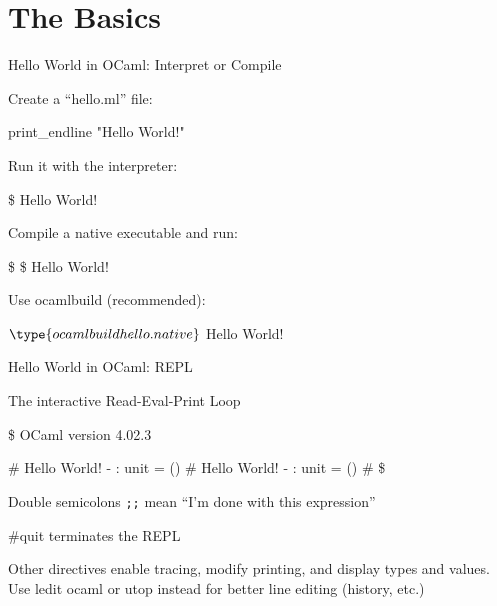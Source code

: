 \documentclass{plt}
\begin{document}
\part{The Basics}

\begin{frame}[fragile]{Hello World in OCaml: Interpret or Compile}

Create a ``hello.ml'' file:

\begin{ocaml}
print_endline "Hello World!"
\end{ocaml}

Run it with the interpreter:

\begin{interactive}
\$ 
Hello World!
\end{interactive}
%
Compile a native executable and run:

\begin{interactive}
\$ 
\$ 
Hello World!
\end{interactive}
%
Use ocamlbuild (recommended):

\begin{interactive}
$ \type{ocamlbuild hello.native}
$ 
Hello World!
\end{interactive}

\end{frame}

\begin{frame}[fragile]{Hello World in OCaml: REPL}

  The interactive Read-Eval-Print Loop

\begin{interactive}
\$ 
        OCaml version 4.02.3

# 
Hello World!
- : unit = ()
# 
Hello World!
- : unit = ()
# 
\$
\end{interactive}
%
Double semicolons \verb|;;| mean ``I'm done with this expression''

\#quit terminates the REPL

Other directives enable tracing, modify printing, and display types
and values. Use \alert{ledit ocaml} or \alert{utop} instead for better line
editing (history, etc.)

\end{frame}
\end{document}
